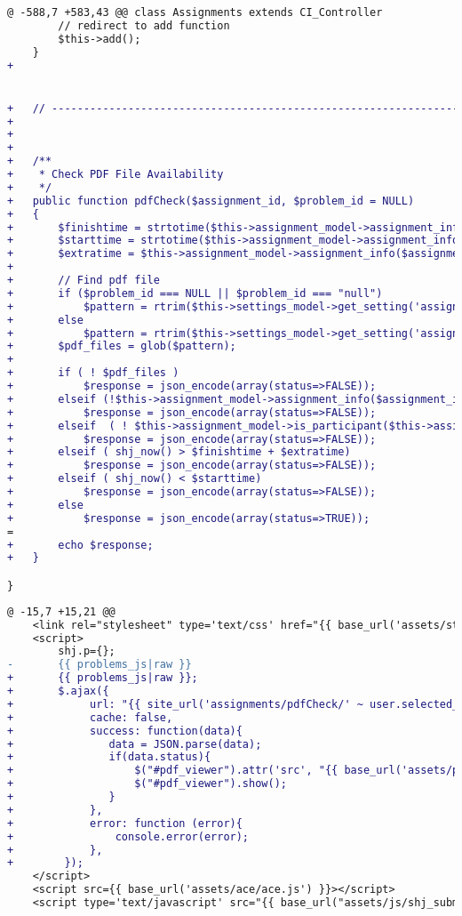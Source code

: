 \begin{lstlisting}[language=diff, caption=Perubahan pada \texttt{Assignments.php}, label=kode:5:checkpdf]
@ -588,7 +583,43 @@ class Assignments extends CI_Controller
		// redirect to add function
		$this->add();
	}
+	


+	// ------------------------------------------------------------------------
+
+
+
+	/**
+	 * Check PDF File Availability
+	 */
+	public function pdfCheck($assignment_id, $problem_id = NULL)
+	{
+		$finishtime = strtotime($this->assignment_model->assignment_info($assignment_id)['finish_time']);
+		$starttime = strtotime($this->assignment_model->assignment_info($assignment_id)['start_time']);
+		$extratime = $this->assignment_model->assignment_info($assignment_id)['extra_time'];
+
+		// Find pdf file
+		if ($problem_id === NULL || $problem_id === "null")
+			$pattern = rtrim($this->settings_model->get_setting('assignments_root'),'/')."/assignment_{$assignment_id}/*.pdf";
+		else
+			$pattern = rtrim($this->settings_model->get_setting('assignments_root'),'/')."/assignment_{$assignment_id}/p{$problem_id}/*.pdf";
+		$pdf_files = glob($pattern);
+
+		if ( ! $pdf_files )
+			$response = json_encode(array(status=>FALSE));
+		elseif (!$this->assignment_model->assignment_info($assignment_id)['open'])
+			$response = json_encode(array(status=>FALSE));
+		elseif	( ! $this->assignment_model->is_participant($this->assignment_model->assignment_info($assignment_id)['participants'],$this->user->username) )
+			$response = json_encode(array(status=>FALSE));
+		elseif ( shj_now() > $finishtime + $extratime)
+			$response = json_encode(array(status=>FALSE));
+		elseif ( shj_now() < $starttime)
+			$response = json_encode(array(status=>FALSE));
+		else
+			$response = json_encode(array(status=>TRUE));
=
+		echo $response;
+	}

}
\end{lstlisting}

\begin{lstlisting}[language=diff, caption=Perubahan pada \texttt{submit.twig}, label=kode:5:viewpdf]
@ -15,7 +15,21 @@
	<link rel="stylesheet" type='text/css' href="{{ base_url('assets/styles/submit.css') }}"/>
	<script>
		shj.p={};
-		{{ problems_js|raw }}
+		{{ problems_js|raw }};
+		$.ajax({
+            url: "{{ site_url('assignments/pdfCheck/' ~ user.selected_assignment.id) }}", 
+            cache: false,
+            success: function(data){
+				data = JSON.parse(data);
+				if(data.status){
+					$("#pdf_viewer").attr('src', "{{ base_url('assets/pdfjs/web/viewer.html?file=') ~ site_url('assignments/pdf/' ~ user.selected_assignment.id ~ '/null/true') }}");
+					$("#pdf_viewer").show();
+				}
+            },
+            error: function (error){
+                console.error(error);
+            },
+        });
	</script>
	<script src={{ base_url('assets/ace/ace.js') }}></script>
	<script type='text/javascript' src="{{ base_url("assets/js/shj_submit.js") }}"></script>
\end{lstlisting}

